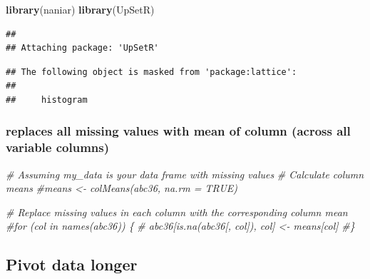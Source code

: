 \documentclass[
]{article}
\newenvironment{Shaded}{\begin{snugshade}}{\end{snugshade}}
\newcommand{\CommentTok}[1]{\textcolor[rgb]{0.56,0.35,0.01}{\textit{#1}}}
\newcommand{\FunctionTok}[1]{\textcolor[rgb]{0.13,0.29,0.53}{\textbf{#1}}}
\newcommand{\NormalTok}[1]{#1}
\begin{document}
\begin{Shaded}
\begin{Highlighting}[]
\FunctionTok{library}\NormalTok{(naniar)}
\FunctionTok{library}\NormalTok{(UpSetR)}
\end{Highlighting}
\end{Shaded}

\begin{verbatim}
## 
## Attaching package: 'UpSetR'
\end{verbatim}

\begin{verbatim}
## The following object is masked from 'package:lattice':
## 
##     histogram
\end{verbatim}

\begin{Shaded}
\end{Shaded}

\hypertarget{replaces-all-missing-values-with-mean-of-column-across-all-variable-columns}{%
\subsubsection{replaces all missing values with mean of column (across all variable columns)}\label{replaces-all-missing-values-with-mean-of-column-across-all-variable-columns}}

\begin{Shaded}
\begin{Highlighting}[]
\CommentTok{\# Assuming \textquotesingle{}my\_data\textquotesingle{} is your data frame with missing values}
\CommentTok{\# Calculate column means}
\CommentTok{\#means \textless{}{-} colMeans(abc36, na.rm = TRUE)}

\CommentTok{\# Replace missing values in each column with the corresponding column mean}
\CommentTok{\#for (col in names(abc36)) \{}
\CommentTok{\#  abc36[is.na(abc36[, col]), col] \textless{}{-} means[col]}
\CommentTok{\#\}}
\end{Highlighting}
\end{Shaded}

\hypertarget{pivot-data-longer}{%
\subsection{Pivot data longer}\label{pivot-data-longer}}
\end{document}
